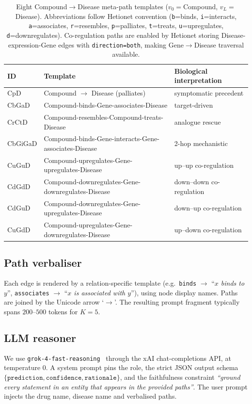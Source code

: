 \documentclass{article}
\begin{document}
\begin{table}[t]
\centering
\small
\caption{Eight Compound$\to$Disease meta-path templates ($v_0{=}$Compound, $v_L{=}$Disease). Abbreviations follow Hetionet convention (\texttt{b}=binds, \texttt{i}=interacts, \texttt{a}=associates, \texttt{r}=resembles, \texttt{p}=palliates, \texttt{t}=treats, \texttt{u}=upregulates, \texttt{d}=downregulates). Co-regulation paths are enabled by Hetionet storing Disease-expression-Gene edges with \texttt{direction=both}, making Gene$\to$Disease traversal available.}
\label{tab:metapaths}
\begin{tabular}{@{}lll@{}}
\toprule
ID & Template & Biological interpretation \\
\midrule
CpD      & Compound $\to$ Disease (palliates)                               & symptomatic precedent \\
CbGaD    & Compound-binds-Gene-associates-Disease                           & target-driven \\
CrCtD    & Compound-resembles-Compound-treats-Disease                       & analogue rescue \\
CbGiGaD  & Compound-binds-Gene-interacts-Gene-associates-Disease            & 2-hop mechanistic \\
CuGuD    & Compound-upregulates-Gene-upregulates-Disease                    & up--up co-regulation \\
CdGdD    & Compound-downregulates-Gene-downregulates-Disease                & down--down co-regulation \\
CdGuD    & Compound-downregulates-Gene-upregulates-Disease                  & down--up co-regulation \\
CuGdD    & Compound-upregulates-Gene-downregulates-Disease                  & up--down co-regulation \\
\bottomrule
\end{tabular}
\end{table}

\subsection{Path verbaliser}
Each edge is rendered by a relation-specific template (e.g.\ \texttt{binds} $\to$ ``\textit{$x$ binds to $y$}'', \texttt{associates} $\to$ ``\textit{$x$ is associated with $y$}''), using node display names. Paths are joined by the Unicode arrow `$\to$'. The resulting prompt fragment typically spans $200$--$500$ tokens for $K{=}5$.

\subsection{LLM reasoner}
\label{sec:method:llm}
We use \texttt{grok-4-fast-reasoning}~\citep{xai2024grok} through the xAI chat-completions API, at temperature $0$. A system prompt pins the role, the strict JSON output schema $\{\texttt{prediction},\texttt{confidence},\texttt{rationale}\}$, and the faithfulness constraint \emph{``ground every statement in an entity that appears in the provided paths''}. The user prompt injects the drug name, disease name and verbalised paths.
\end{document}

